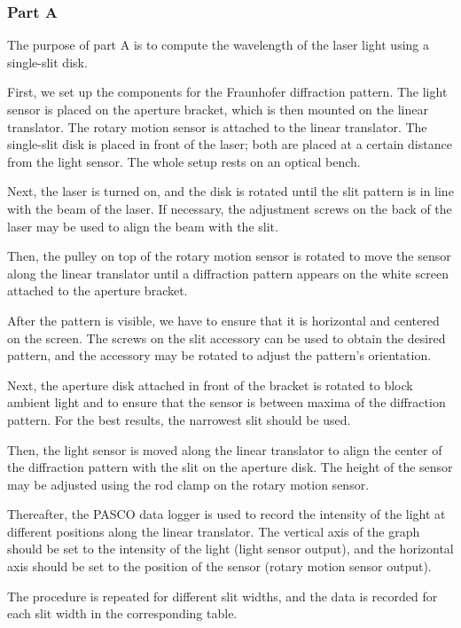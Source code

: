 \documentclass[10pt]{article}
\begin{document}
\subsubsection*{Part A}

The purpose of part A is to compute the wavelength of the laser light using a single-slit disk.

First, we set up the components for the Fraunhofer diffraction pattern. The light sensor is placed on the aperture bracket, which is then mounted on the linear translator. The rotary motion sensor is attached to the linear translator. The single-slit disk is placed in front of the laser; both are placed at a certain distance from the light sensor. The whole setup rests on an optical bench.

Next, the laser is turned on, and the disk is rotated until the slit pattern is in line with the beam of the laser. If necessary, the adjustment screws on the back of the laser may be used to align the beam with the slit. 

Then, the pulley on top of the rotary motion sensor is rotated to move the sensor along the linear translator until a diffraction pattern appears on the white screen attached to the aperture bracket. 

After the pattern is visible, we have to ensure that it is horizontal and centered on the screen. The screws on the slit accessory can be used to obtain the desired pattern, and the accessory may be rotated to adjust the pattern's orientation.

Next, the aperture disk attached in front of the bracket is rotated to block ambient light and to ensure that the sensor is between maxima of the diffraction pattern. For the best results, the narrowest slit should be used.

Then, the light sensor is moved along the linear translator to align the center of the diffraction pattern with the slit on the aperture disk. The height of the sensor may be adjusted using the rod clamp on the rotary motion sensor.

Thereafter, the PASCO{\textsuperscript\textregistered} data logger is used to record the intensity of the light at different positions along the linear translator. The vertical axis of the graph should be set to the intensity of the light (light sensor output), and the horizontal axis should be set to the position of the sensor (rotary motion sensor output).

The procedure is repeated for different slit widths, and the data is recorded for each slit width in the corresponding table.
\end{document}
